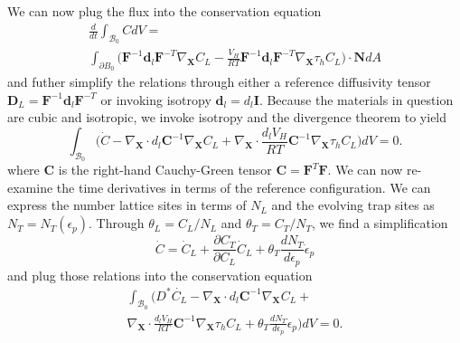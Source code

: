 \documentclass[10pt]{elsarticle}
\newcommand{\mbs}[1]{\boldsymbol{#1}}
\def\bs{{\mbs{s}}} \def\bt{{\mbs{t}}} \def\bu{{\mbs{u}}}
\def\bs{\boldsymbol}
\begin{document}
We can now plug the flux into the conservation equation 
%
\begin{align}
\label{eq.hconservationref2} \frac{d}{dt} \int_{\mathcal{B}_{0}} C dV =  \nonumber \\ \int_{\partial B_{0}} \bigg( \bs{F}^{-1} \bs{d}_{l}   \bs{F}^{-T}  \nabla_{\bs{X}} C_{L} -  \frac{V_{H}}{RT} \bs{F}^{-1} \bs{d}_{l}   \bs{F}^{-T}  \nabla_{\bs{X}}\tau_{h} C_{L} \bigg) \cdot \bs{N} dA 
\end{align}
%
and futher simplify the relations through either a reference diffusivity tensor $\bs{D}_{L} = \bs{F}^{-1} \bs{d}_{l}   \bs{F}^{-T}$ or invoking isotropy $\bs{d}_{l} = d_{l}\bs{I}$. Because the materials in question are cubic and isotropic, we invoke isotropy and the divergence theorem to yield
%
%
\begin{equation}
\label{eq.hconservationref3} \int_{\mathcal{B}_{0}} \bigg( \dot{C} -   \nabla_{\bs{X}}  \cdot d_{l} \bs{C}^{-1}  \nabla_{\bs{X}} C_{L}  +   \nabla_{\bs{X}}  \cdot \frac{ d_{l} V_{H}}{RT} \bs{C}^{-1} \nabla_{\bs{X}} \tau_{h} C_{L} \bigg) dV = 0.
\end{equation}
%
where $\bs{C}$ is the right-hand Cauchy-Green tensor $\bs{C} = \bs{F}^{T}\bs{F}$. We can now re-examine the time derivatives in terms of the reference configuration. We can express the number lattice sites in terms of $N_{L}$ and the evolving trap sites as $N_{T} = N_{T}(\epsilon_{p})$. Through $\theta_{L} = C_{L}/N_{L}$ and $\theta_{T} = C_{T}/N_{T}$, we find a simplification
%
\begin{equation}
\label{eq.cdotref}{\dot{C} = \dot{C}_{L} + \frac{\partial C_{T}}{\partial C_{L}} \dot{C}_{L} +\theta_{T} \frac{d N_{T}}{d \epsilon_{p}} \dot{\epsilon}_{p}} 
\end{equation}
and plug those relations into the conservation equation
%
\begin{align}
\label{eq.hconservationref4} \int_{\mathcal{B}_{0}} \bigg( D^{*}\dot{C_{L}} -   \nabla_{\bs{X}}  \cdot d_{l} \bs{C}^{-1}  \nabla_{\bs{X}} C_{L}  +   \nonumber \\ \nabla_{\bs{X}}  \cdot \frac{d_{l} V_{H}}{RT} \bs{C}^{-1} \nabla_{\bs{X}} \tau_{h} C_{L} + \theta_{T} \frac{d N_{T}}{d \epsilon_{p}} \dot{\epsilon}_{p} \bigg) dV = 0.
\end{align}
\end{document}
